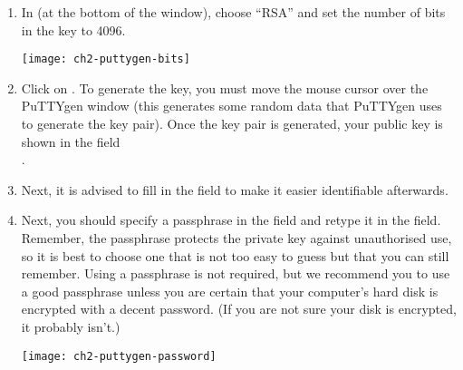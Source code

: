   \begin{enumerate}
    \item  In  (at the bottom of the window), choose
      ``RSA'' and set the number of bits in the key to 4096.

    \begin{center}
    \texttt{[image: ch2-puttygen-bits]}
    \end{center}

    \item  Click on . To generate the key, you must move
      the mouse cursor over the PuTTYgen window (this generates some random
      data that PuTTYgen uses to generate the key pair). Once the key pair is
      generated, your public key is shown in the field \\
      .
    \item  Next, it is advised to fill in the  field
      to make it easier identifiable afterwards.
    \item  Next, you should specify a passphrase in the 
      field and retype it in the  field.
      Remember, the passphrase protects the private key against unauthorised
      use, so it is best to choose one that is not too easy to guess but that
      you can still remember.
      Using a passphrase is not required, but we recommend you to use a good
      passphrase unless you are certain that your computer's hard disk is
      encrypted with a decent password. (If you are not sure your disk is
      encrypted, it probably isn't.)

    \begin{center}
    \texttt{[image: ch2-puttygen-password]}
    \end{center}


\end{enumerate}
